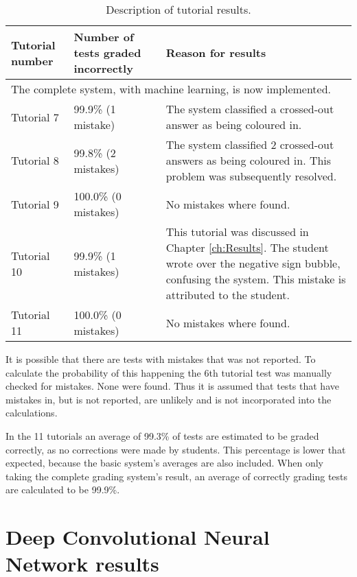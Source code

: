 \begin{table}
\caption{Description of tutorial results.} \label{tbl:tutResults2}
  \centering
\begin{tabular}{|p{2cm}|p{4cm}|p{5cm}|}
\hline
\textbf{Tutorial number}&\textbf{Number of tests graded incorrectly}&\textbf{Reason for results}\\
\hline
\multicolumn{3}{|l|}{The complete system,  with machine learning, is now implemented.}\\
\hline
Tutorial 7&99.9\% (1 mistake)&The system classified a crossed-out answer as being coloured in.\\
\hline
Tutorial 8&99.8\% (2 mistakes)&The system classified 2 crossed-out answers as being coloured in. This problem was subsequently resolved.\\
\hline
Tutorial 9&100.0\% (0 mistakes)&No mistakes where found.\\
\hline
Tutorial 10&99.9\% (1 mistakes)&This tutorial was discussed in Chapter \ref{ch:Results}. The student wrote over the negative sign bubble, confusing the system. This mistake is attributed to the student.\\
\hline
Tutorial 11&100.0\% (0 mistakes)&No mistakes where found.\\
\hline
\end{tabular}
\end{table}

It is possible that there are tests with mistakes that was not reported. To calculate the probability of this happening the 6th tutorial test was manually checked for mistakes. None were found. Thus it is assumed that tests that have mistakes in, but is not reported, are unlikely and is not incorporated into the calculations.

In the 11 tutorials an average of 99.3\% of tests are estimated to be graded correctly, as no corrections were made by students.  This percentage is lower that expected, because the basic system's averages are also included. When only taking the complete grading system's result, an average of correctly grading tests are calculated to be 99.9\%.


\section{Deep Convolutional Neural Network results}
\label{sec:DCNNresult}

